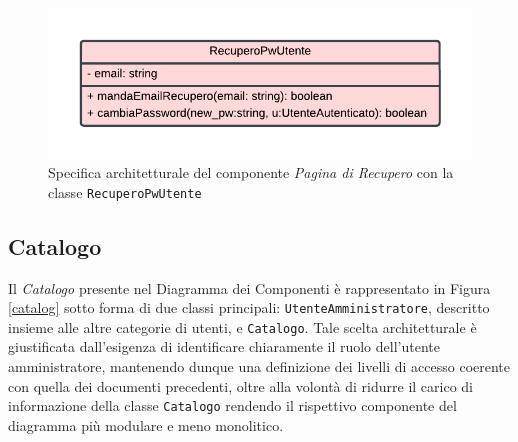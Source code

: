 \documentclass[11pt, a4paper]{article}
\theoremstyle{definition} %
\begin{document}
\begin{figure}[H]
\centering
\includegraphics[scale = 0.9]{materiale/class-recupero.pdf}
\caption{Specifica architetturale del componente \textit{Pagina di Recupero} con la classe \texttt{RecuperoPwUtente}}
\label{recupero}
\end{figure}



\newpage
\subsection{Catalogo}
Il \textit{Catalogo} presente nel Diagramma dei Componenti è rappresentato in
Figura \ref{catalog} sotto forma di due classi principali: \texttt{UtenteAmministratore}, descritto insieme
alle altre categorie di utenti, e \texttt{Catalogo}. Tale scelta architetturale
è giustificata dall'esigenza di identificare chiaramente il ruolo dell'utente
amministratore, mantenendo dunque una definizione dei livelli di accesso
coerente con quella dei documenti precedenti, oltre alla volontà di ridurre il
carico di informazione della classe \texttt{Catalogo} rendendo il rispettivo
componente del diagramma più modulare e meno monolitico.
\end{document}
